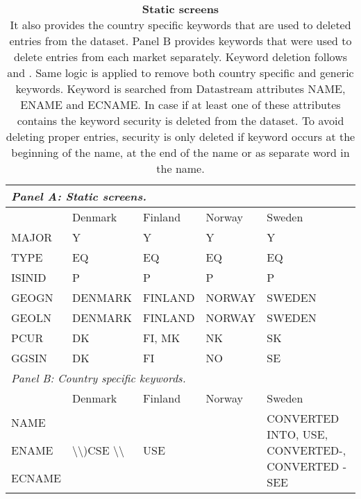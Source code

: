 \documentclass[12pt]{article}
\begin{document}
\begin{table}[ht]
\footnotesize
\caption[Static screens]{\textbf{Static screens}\\ It also provides the country specific keywords that are used to deleted entries from the dataset. Panel B provides keywords that were used to delete entries from each market separately. Keyword deletion follows  \protect\citet{Ince2006} and \protect\citet{HANAUER2023106712}. Same logic is applied to remove both country specific and generic keywords. Keyword is searched from Datastream attributes NAME, ENAME and ECNAME. In case if at least one of these attributes contains the keyword security is deleted from the dataset. To avoid deleting proper entries, security is only deleted if keyword occurs at the beginning of the name, at the end of the name or as separate word in the name.}
\label{table:StaticScreens}
\begin{tabularx}{\textwidth}{X X X X l}
\toprule
\multicolumn{5}{l}{\textit{Panel A: Static screens.}} \\
\midrule
 & Denmark & Finland & Norway & Sweden\\
\midrule
MAJOR & Y & Y & Y & Y\\
TYPE & EQ & EQ & EQ & EQ\\
ISINID & P & P & P & P\\
GEOGN & DENMARK & FINLAND & NORWAY & SWEDEN\\
GEOLN & DENMARK & FINLAND & NORWAY & SWEDEN\\
PCUR & DK & FI, MK & NK & SK\\
GGSIN & DK & FI & NO &SE\\
\toprule
\multicolumn{5}{l}{\textit{Panel B: Country specific keywords.}} \\
\midrule
 & Denmark & Finland & Norway & Sweden\\
 \midrule
NAME & \multirow[m]{3}{*}{ \textbackslash \textbackslash)CSE \textbackslash \textbackslash} & \multirow[m]{3}{*}{USE} & & \multirow[m]{3}{13em}{CONVERTED INTO, USE, CONVERTED-, CONVERTED - SEE}\\
ENAME & & \\
ECNAME & &\\
\bottomrule
\end{tabularx}
\end{table}
\end{document}
